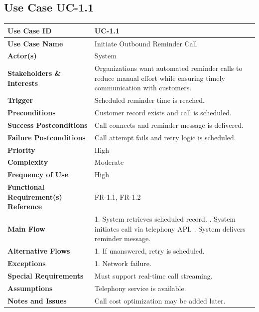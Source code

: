 \documentclass[12pt,a4paper]{report}
\begin{document}
\subsection*{Use Case UC-1.1}
\begin{longtable}{|p{4cm}|p{9cm}|}
\hline
\textbf{Use Case ID} & UC-1.1 \\ \hline
\textbf{Use Case Name} & Initiate Outbound Reminder Call \\ \hline
\textbf{Actor(s)} & System \\ \hline
\textbf{Stakeholders \& Interests} & Organizations want automated reminder calls to reduce manual effort while ensuring timely communication with customers. \\ \hline
\textbf{Trigger} & Scheduled reminder time is reached. \\ \hline
\textbf{Preconditions} & Customer record exists and call is scheduled. \\ \hline
\textbf{Success Postconditions} & Call connects and reminder message is delivered. \\ \hline
\textbf{Failure Postconditions} & Call attempt fails and retry logic is scheduled. \\ \hline
\textbf{Priority} & High \\ \hline
\textbf{Complexity} & Moderate \\ \hline
\textbf{Frequency of Use} & High \\ \hline
\textbf{Functional Requirement(s) Reference} & FR-1.1, FR-1.2 \\ \hline
\textbf{Main Flow} &
1. System retrieves scheduled record. \newline
2. System initiates call via telephony API. \newline
3. System delivers reminder message. \\ \hline
\textbf{Alternative Flows} &
1. If unanswered, retry is scheduled. \\ \hline
\textbf{Exceptions} &
1. Network failure. \\ \hline
\textbf{Special Requirements} &
Must support real-time call streaming. \\ \hline
\textbf{Assumptions} &
Telephony service is available. \\ \hline
\textbf{Notes and Issues} &
Call cost optimization may be added later. \\ \hline
\end{longtable}

\end{document}
